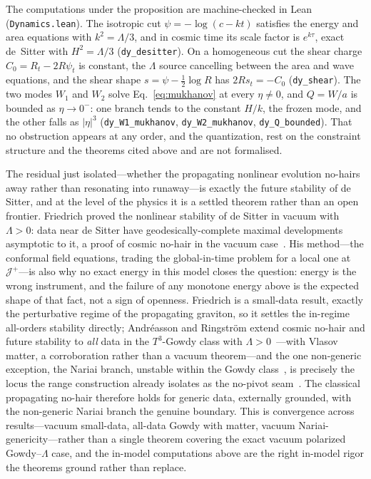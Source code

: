 \documentclass[11pt,a4paper]{article}
\theoremstyle{plain}
\theoremstyle{definition}
\theoremstyle{remark}
\begin{document}
\noindent The computations under the proposition are machine-checked in Lean (\texttt{Dynamics.lean}). The isotropic cut $\psi=-\log(c-kt)$ satisfies the energy and area equations with $k^{2}=\Lambda/3$, and in cosmic time its scale factor is $e^{k\tau}$, exact de~Sitter with $H^{2}=\Lambda/3$ (\texttt{dy\_desitter}). On a homogeneous cut the shear charge $C_0=R_t-2R\psi_t$ is constant, the $\Lambda$ source cancelling between the area and wave equations, and the shear shape $s=\psi-\tfrac12\log R$ has $2Rs_t=-C_0$ (\texttt{dy\_shear}). The two modes $W_1$ and $W_2$ solve Eq.~\eqref{eq:mukhanov} at every $\eta\neq0$, and $Q=W/a$ is bounded as $\eta\to0^{-}$: one branch tends to the constant $H/k$, the frozen mode, and the other falls as $|\eta|^{3}$ (\texttt{dy\_W1\_mukhanov}, \texttt{dy\_W2\_mukhanov}, \texttt{dy\_Q\_bounded}). That no obstruction appears at any order, and the quantization, rest on the constraint structure and the theorems cited above and are not formalised.

The residual just isolated---whether the propagating nonlinear evolution no-hairs away rather than resonating into runaway---is exactly the future stability of de Sitter, and at the level of the physics it is a settled theorem rather than an open frontier. Friedrich proved the nonlinear stability of de Sitter in vacuum with $\Lambda>0$: data near de Sitter have geodesically-complete maximal developments asymptotic to it, a proof of cosmic no-hair in the vacuum case~\cite{Friedrich1986}. His method---the conformal field equations, trading the global-in-time problem for a local one at $\mathcal{J}^+$---is also why no exact energy in this model closes the question: energy is the wrong instrument, and the failure of any monotone energy above is the expected shape of that fact, not a sign of openness. Friedrich is a small-data result, exactly the perturbative regime of the propagating graviton, so it settles the in-regime all-orders stability directly; Andr\'easson and Ringstr\"om extend cosmic no-hair and future stability to \emph{all} data in the $T^3$-Gowdy class with $\Lambda>0$~\cite{AndreassonRingstrom2016}---with Vlasov matter, a corroboration rather than a vacuum theorem---and the one non-generic exception, the Nariai branch, unstable within the Gowdy class~\cite{Beyer2009}, is precisely the locus the range construction already isolates as the no-pivot seam~\cite{JanzenRange}. The classical propagating no-hair therefore holds for generic data, externally grounded, with the non-generic Nariai branch the genuine boundary. This is convergence across results---vacuum small-data, all-data Gowdy with matter, vacuum Nariai-genericity---rather than a single theorem covering the exact vacuum polarized Gowdy--$\Lambda$ case, and the in-model computations above are the right in-model rigor the theorems ground rather than replace.
\end{document}
